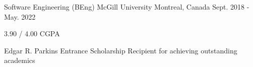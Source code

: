 

\begin{cventries}

  \cventry
    {Software Engineering (BEng)} %
    {McGill University} %
    {Montreal, Canada} %
    {Sept. 2018 - May. 2022} %
    {
      \begin{cvitems} %
        \item {3.90 / 4.00 CGPA}
        \item {Edgar R. Parkins Entrance Scholarship Recipient for achieving outstanding academics}
      \end{cvitems}
    }

\end{cventries}
